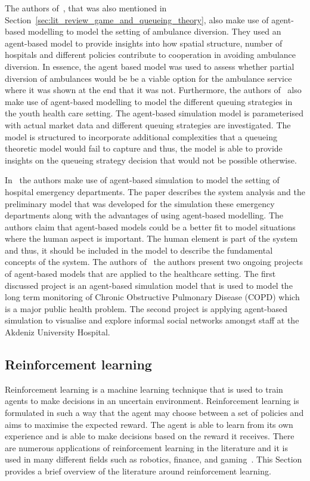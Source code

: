 The authors of~\cite{hagtvedt2009cooperative}, that was also mentioned in
Section~\ref{sec:lit_review_game_and_queueing_theory}, also make use of
agent-based modelling to model the setting of ambulance diversion. 
They used an agent-based model to provide insights into how spatial structure,
number of hospitals and different policies contribute to cooperation in
avoiding ambulance diversion.
In essence, the agent based model was used to assess whether partial diversion
of ambulances would be be a viable option for the ambulance service where it
was shown at the end that it was not.
Furthermore, the authors of~\cite{Giesen2009} also make use of agent-based
modelling to model the different queuing strategies in the youth health care
setting.
The agent-based simulation model is parameterised with actual market data and
different queuing strategies are investigated.
The model is structured to incorporate additional complexities that a queueing
theoretic model would fail to capture and thus, the model is able to provide
insights on the queueing strategy decision that would not be possible
otherwise.

In~\cite{Stainsby2009536} the authors make use of agent-based simulation to
model the setting of hospital emergency departments.
The paper describes the system analysis and the preliminary model that was
developed for the simulation these emergency departments along with the
advantages of using agent-based modelling.
The authors claim that agent-based models could be a better fit to model
situations where the human aspect is important.
The human element is part of the system and thus, it should be included in the
model to describe the fundamental concepts of the system.
The authors of~\cite{Bilge2006699} the authors present two ongoing projects of
agent-based models that are applied to the healthcare setting.
The first discussed project is an agent-based simulation model that is used to
model the long term monitoring of Chronic Obstructive Pulmonary Disease (COPD)
which is a major public health problem.
The second project is applying agent-based simulation to visualise and explore
informal social networks amongst staff at the Akdeniz University Hospital.




\subsection{Reinforcement learning}

Reinforcement learning is a machine learning technique that is used to
train agents to make decisions in an uncertain environment.
Reinforcement learning is formulated in such a way that the agent may choose
between a set of policies and aims to maximise the expected reward.
The agent is able to learn from its own experience and is able to make
decisions based on the reward it receives.
There are numerous applications of reinforcement learning in the literature
and it is used in many different fields such as robotics, finance, and
gaming~\cite{sutton2018reinforcement}.
This Section provides a brief overview of the literature around reinforcement
learning.

